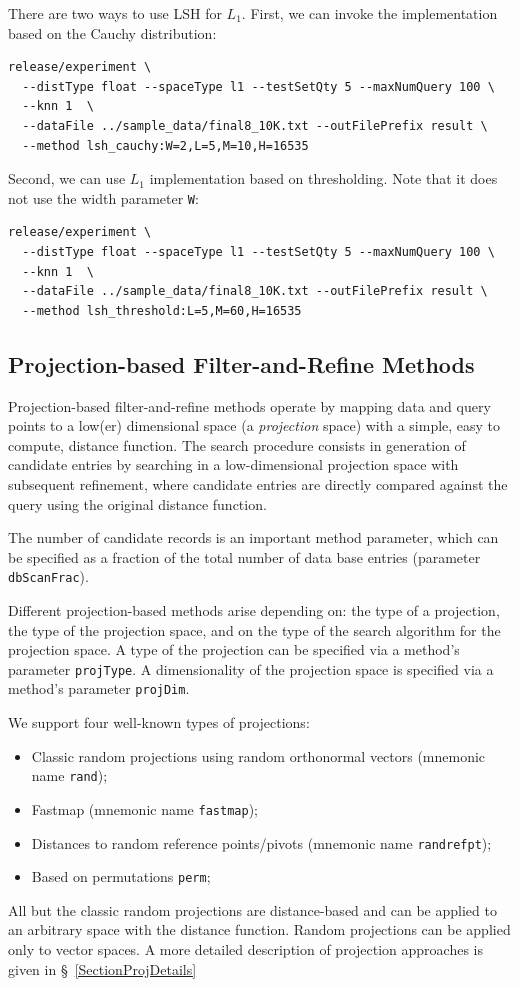 \documentclass[runningheads,a4paper]{llncs}
\newcommand{\ttt}[1]{\texttt{#1}}
\begin{document}
{There are two ways to use LSH for $L_1$. First, 
we can invoke the implementation based on the Cauchy distribution:
{
\footnotesize
\begin{verbatim}
release/experiment \
  --distType float --spaceType l1 --testSetQty 5 --maxNumQuery 100 \
  --knn 1  \
  --dataFile ../sample_data/final8_10K.txt --outFilePrefix result \
  --method lsh_cauchy:W=2,L=5,M=10,H=16535
\end{verbatim}
}

Second, we can use $L_1$ implementation based on thresholding.
Note that it does not use the width parameter \texttt{W}:
{
\footnotesize
\begin{verbatim}
release/experiment \
  --distType float --spaceType l1 --testSetQty 5 --maxNumQuery 100 \
  --knn 1  \
  --dataFile ../sample_data/final8_10K.txt --outFilePrefix result \
  --method lsh_threshold:L=5,M=60,H=16535
\end{verbatim}
}

\subsection{Projection-based Filter-and-Refine Methods}\label{SectionProjMethod}
Projection-based filter-and-refine methods operate by mapping data and query points
to a low(er) dimensional space (a \emph{projection} space) with a simple, 
easy to compute, distance function.
The search procedure consists in generation of candidate entries by searching
in a low-dimensional projection space with subsequent
refinement, where candidate entries are directly compared against the query
using the original distance function.

The number of candidate records is an important method parameter,
which can be specified as a fraction of the total number of data base entries
(parameter \ttt{dbScanFrac}). 

Different projection-based methods arise depending on: 
the type of a projection, the type of the projection space, 
and on the type of the search algorithm for the projection space.
A type of the projection can be specified via a method's parameter \ttt{projType}.
A dimensionality of the projection space is specified via a method's parameter \ttt{projDim}.

We support four well-known types of projections:
\begin{itemize}
\item Classic random projections using random orthonormal vectors (mnemonic name \ttt{rand});
\item Fastmap (mnemonic name \ttt{fastmap});
\item Distances to random reference points/pivots (mnemonic name \ttt{randrefpt});
\item Based on permutations \ttt{perm};
\end{itemize}
All but the classic random projections are distance-based and
can be applied to an arbitrary space with the distance function.
Random projections can be applied only to vector spaces.
A more detailed description of projection approaches is given in \S~\ref{SectionProjDetails}

}
\end{document}
